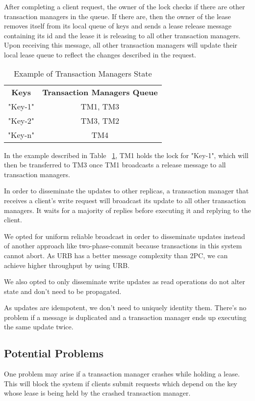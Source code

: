 \documentclass[times, 10pt,twocolumn]{article}
\begin{document}
After completing a client request, the owner of the lock checks if there are other transaction managers in the queue. If there are, then the owner of the lease removes itself from its local queue of keys and sends a lease release message containing its id and the lease it is releasing to all other transaction managers. Upon receiving this message, all other transaction managers will update their local lease queue to reflect the changes described in the request. 

\begin{table}[H]
    \centering
    \begin{tabular}{cc}
         \textbf{Keys} & \textbf{Transaction Managers Queue}\\
         "Key-1" &  TM1, TM3\\
         "Key-2" & TM3, TM2\\
         "Key-n" & TM4\\
    \end{tabular}
    \caption{Example of Transaction Managers State}
    \label{tab:tm_state}
\end{table}


In the example described in Table ~\ref{tab:tm_state}, TM1 holds the lock for "Key-1", which will then be transferred to TM3 once TM1 broadcasts a release message to all transaction managers.

In order to disseminate the updates to other replicas, a transaction manager that receives a client's write request will broadcast its update to all other transaction managers. It waits for a majority of replies before executing it and replying to the client.

We opted for uniform reliable broadcast in order to disseminate updates instead of another approach like two-phase-commit because transactions in this system cannot abort. As URB has a better message complexity than 2PC, we can achieve higher throughput by using URB.

We also opted to only disseminate write updates as read operations do not alter state and don't need to be propagated.

As updates are idempotent, we don't need to uniquely identity them. There's no problem if a message is duplicated and a transaction manager ends up executing the same update twice.

\subsection{Potential Problems}
One problem may arise if a transaction manager crashes while holding a lease. This will block the system if clients submit requests which depend on the key whose lease is being held by the crashed transaction manager.
\end{document}
